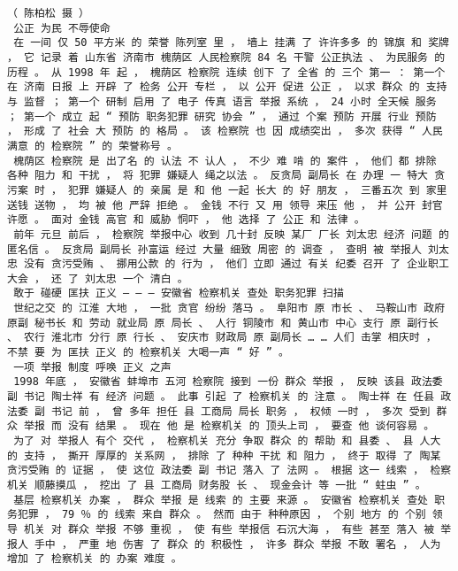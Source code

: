 \documentclass{article}
\begin{document}
\begin{Verbatim}[commandchars=\\\{\}]
 （ 陈柏松 摄 ） 
 公正 为民 不辱使命 
 在 一间 仅 50 平方米 的 荣誉 陈列室 里 ， 墙上 挂满 了 许许多多 的 锦旗 和 奖牌 ， 它 记录 着 山东省 济南市 槐荫区 人民检察院 84 名 干警 公正执法 、 为民服务 的 历程 。 从 1998 年 起 ， 槐荫区 检察院 连续 创下 了 全省 的 三个 第一 ： 第一个 在 济南 日报 上 开辟 了 检务 公开 专栏 ， 以 公开 促进 公正 ， 以求 群众 的 支持 与 监督 ； 第一个 研制 启用 了 电子 传真 语言 举报 系统 ， 24 小时 全天候 服务 ； 第一个 成立 起 “ 预防 职务犯罪 研究 协会 ” ， 通过 个案 预防 开展 行业 预防 ， 形成 了 社会 大 预防 的 格局 。 该 检察院 也 因 成绩突出 ， 多次 获得 “ 人民满意 的 检察院 ” 的 荣誉称号 。 
 槐荫区 检察院 是 出了名 的 认法 不 认人 ， 不少 难 啃 的 案件 ， 他们 都 排除 各种 阻力 和 干扰 ， 将 犯罪 嫌疑人 绳之以法 。 反贪局 副局长 在 办理 一 特大 贪污案 时 ， 犯罪 嫌疑人 的 亲属 是 和 他 一起 长大 的 好 朋友 ， 三番五次 到 家里 送钱 送物 ， 均 被 他 严辞 拒绝 。 金钱 不行 又 用 领导 来压 他 ， 并 公开 封官许愿 。 面对 金钱 高官 和 威胁 恫吓 ， 他 选择 了 公正 和 法律 。 
 前年 元旦 前后 ， 检察院 举报中心 收到 几十封 反映 某厂 厂长 刘太忠 经济 问题 的 匿名信 。 反贪局 副局长 孙富运 经过 大量 细致 周密 的 调查 ， 查明 被 举报人 刘太忠 没有 贪污受贿 、 挪用公款 的 行为 ， 他们 立即 通过 有关 纪委 召开 了 企业职工 大会 ， 还 了 刘太忠 一个 清白 。 
 敢于 碰硬 匡扶 正义 — — — 安徽省 检察机关 查处 职务犯罪 扫描 
 世纪之交 的 江淮 大地 ， 一批 贪官 纷纷 落马 。 阜阳市 原 市长 、 马鞍山市 政府 原副 秘书长 和 劳动 就业局 原 局长 、 人行 铜陵市 和 黄山市 中心 支行 原 副行长 、 农行 淮北市 分行 原 行长 、 安庆市 财政局 原 副局长 … … 人们 击掌 相庆时 ， 不禁 要 为 匡扶 正义 的 检察机关 大喝一声 “ 好 ” 。 
 一项 举报 制度 呼唤 正义 之声 
 1998 年底 ， 安徽省 蚌埠市 五河 检察院 接到 一份 群众 举报 ， 反映 该县 政法委 副 书记 陶士祥 有 经济 问题 。 此事 引起 了 检察机关 的 注意 。 陶士祥 在 任县 政法委 副 书记 前 ， 曾 多年 担任 县 工商局 局长 职务 ， 权倾 一时 ， 多次 受到 群众 举报 而 没有 结果 。 现在 他 是 检察机关 的 顶头上司 ， 要查 他 谈何容易 。 
 为了 对 举报人 有个 交代 ， 检察机关 充分 争取 群众 的 帮助 和 县委 、 县 人大 的 支持 ， 撕开 厚厚的 关系网 ， 排除 了 种种 干扰 和 阻力 ， 终于 取得 了 陶某 贪污受贿 的 证据 ， 使 这位 政法委 副 书记 落入 了 法网 。 根据 这一 线索 ， 检察机关 顺藤摸瓜 ， 挖出 了 县 工商局 财务股 长 、 现金会计 等 一批 “ 蛀虫 ” 。 
 基层 检察机关 办案 ， 群众 举报 是 线索 的 主要 来源 。 安徽省 检察机关 查处 职务犯罪 ， 79 ％ 的 线索 来自 群众 。 然而 由于 种种原因 ， 个别 地方 的 个别 领导 机关 对 群众 举报 不够 重视 ， 使 有些 举报信 石沉大海 ， 有些 甚至 落入 被 举报人 手中 ， 严重 地 伤害 了 群众 的 积极性 ， 许多 群众 举报 不敢 署名 ， 人为 增加 了 检察机关 的 办案 难度 。 

\end{Verbatim}
\end{document}
